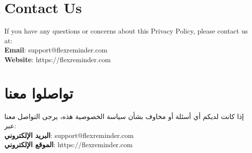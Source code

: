 \documentclass[12pt]{article}
\begin{document}
\section{Contact Us}
If you have any questions or concerns about this Privacy Policy, please contact us at: \\
\textbf{Email}: support@flexreminder.com \\
\textbf{Website}: https://flexreminder.com

\section*{\textarabic{تواصلوا معنا}}
\textarabic{إذا كانت لديكم أي أسئلة أو مخاوف بشأن سياسة الخصوصية هذه، يرجى التواصل معنا عبر:} \\
\textarabic{\textbf{البريد الإلكتروني}: support@flexreminder.com} \\
\textarabic{\textbf{الموقع الإلكتروني}: https://flexreminder.com}
\end{document}
